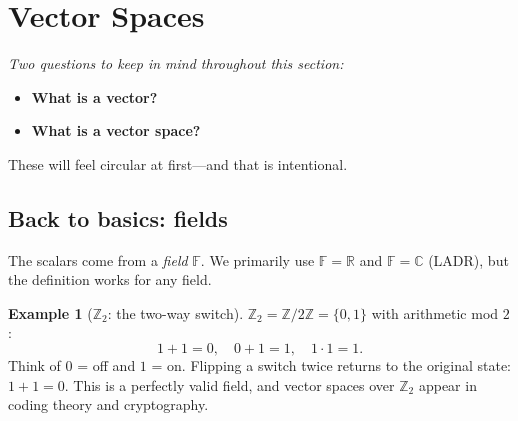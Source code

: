 \documentclass[11pt]{article}
\theoremstyle{definition}
\newtheorem{example}{Example}[section]
\theoremstyle{plain}
\begin{document}
\section{Vector Spaces}

\noindent\textit{Two questions to keep in mind throughout this section:}
\begin{itemize}
  \item \textbf{What is a vector?}
  \item \textbf{What is a vector space?}
\end{itemize}
These will feel circular at first---and that is intentional.

\subsection{Back to basics: fields}

The scalars come from a \emph{field} $\mathbb{F}$.  We primarily use
$\mathbb{F}=\mathbb{R}$ and $\mathbb{F}=\mathbb{C}$ (LADR), but the
definition works for any field.

\begin{example}[$\mathbb{Z}_2$: the two-way switch]
  $\mathbb{Z}_2 = \mathbb{Z}/2\mathbb{Z} = \{0, 1\}$ with arithmetic mod $2$:
  \[
    1 + 1 = 0, \quad 0 + 1 = 1, \quad 1 \cdot 1 = 1.
  \]
  Think of $0$ = off and $1$ = on.  Flipping a switch twice returns to the
  original state: $1+1=0$.  This is a perfectly valid field, and vector spaces
  over $\mathbb{Z}_2$ appear in coding theory and cryptography.
\end{example}
\end{document}
